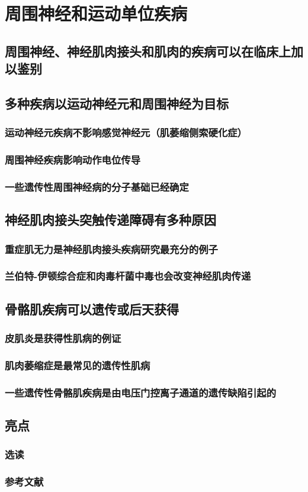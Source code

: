\chapter{周围神经和运动单位疾病}


\section{周围神经、神经肌肉接头和肌肉的疾病可以在临床上加以鉴别}

\section{多种疾病以运动神经元和周围神经为目标}
\subsection{运动神经元疾病不影响感觉神经元（肌萎缩侧索硬化症）}
\subsection{周围神经疾病影响动作电位传导}
\subsection{一些遗传性周围神经病的分子基础已经确定}

\section{神经肌肉接头突触传递障碍有多种原因}
\subsection{重症肌无力是神经肌肉接头疾病研究最充分的例子}
\subsection{兰伯特-伊顿综合症和肉毒杆菌中毒也会改变神经肌肉传递}

\section{骨骼肌疾病可以遗传或后天获得}
\subsection{皮肌炎是获得性肌病的例证}
\subsection{肌肉萎缩症是最常见的遗传性肌病}
\subsection{一些遗传性骨骼肌疾病是由电压门控离子通道的遗传缺陷引起的}

\section{亮点}
\subsection{选读}
\subsection{参考文献}
